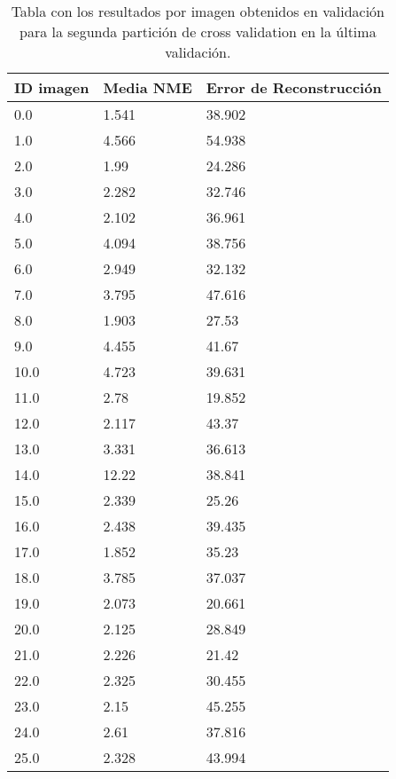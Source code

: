 \begin{table}[!ht]
    \centering
    \caption{Tabla con los resultados por imagen obtenidos en validación para la segunda partición de cross validation en la última validación.}
    \begin{tabular}{|l|l|l|}
    \hline
        ID imagen & Media NME & Error de Reconstrucción \\ \hline
        0.0 & 1.541 & 38.902 \\ \hline
        1.0 & 4.566 & 54.938 \\ \hline
        2.0 & 1.99 & 24.286 \\ \hline
        3.0 & 2.282 & 32.746 \\ \hline
        4.0 & 2.102 & 36.961 \\ \hline
        5.0 & 4.094 & 38.756 \\ \hline
        6.0 & 2.949 & 32.132 \\ \hline
        7.0 & 3.795 & 47.616 \\ \hline
        8.0 & 1.903 & 27.53 \\ \hline
        9.0 & 4.455 & 41.67 \\ \hline
        10.0 & 4.723 & 39.631 \\ \hline
        11.0 & 2.78 & 19.852 \\ \hline
        12.0 & 2.117 & 43.37 \\ \hline
        13.0 & 3.331 & 36.613 \\ \hline
        14.0 & 12.22 & 38.841 \\ \hline
        15.0 & 2.339 & 25.26 \\ \hline
        16.0 & 2.438 & 39.435 \\ \hline
        17.0 & 1.852 & 35.23 \\ \hline
        18.0 & 3.785 & 37.037 \\ \hline
        19.0 & 2.073 & 20.661 \\ \hline
        20.0 & 2.125 & 28.849 \\ \hline
        21.0 & 2.226 & 21.42 \\ \hline
        22.0 & 2.325 & 30.455 \\ \hline
        23.0 & 2.15 & 45.255 \\ \hline
        24.0 & 2.61 & 37.816 \\ \hline
        25.0 & 2.328 & 43.994 \\ \hline
    \end{tabular}
    \label{table:Decoder_images_2}
\end{table}

